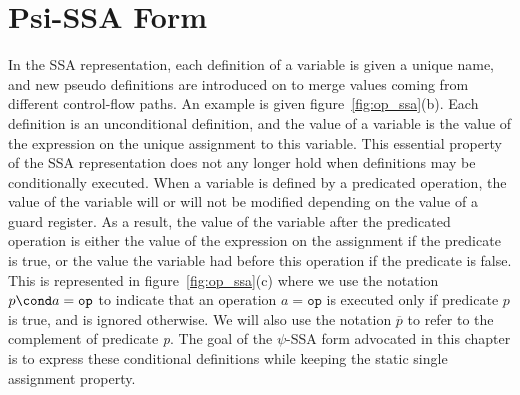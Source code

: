 \chapter{Psi-SSA Form }
\label{chapter:psi_ssa}




In the SSA representation, each definition of a variable is given a
unique name, and new pseudo definitions are introduced on \phifuns to merge values coming from different control-flow paths. An
example is given figure~\ref{fig:op_ssa}(b). Each definition is an
unconditional definition, and the value of a variable is the value of
the expression on the unique assignment to this variable. This
essential property of the SSA representation does not any longer hold
when definitions may be conditionally executed. When a variable is defined by a predicated operation, the value of the variable
will or will not be modified depending on the value of a guard
register. As a result, the value of the variable after the predicated
operation is either the value of the expression on the assignment if
the predicate is true, or the value the variable had before this
operation if the predicate is false. This is represented in
figure~\ref{fig:op_ssa}(c) where we use the notation $p\cond a = \texttt{op}$ to indicate that an operation $a = \texttt{op}$ is executed only if predicate $p$ is true, and is ignored otherwise. We will also use the notation $\overline{{p}}$ to refer to the complement of predicate \textit{p}.
The goal of the $\psi$-SSA form advocated in this chapter is to express these conditional definitions while keeping the static single assignment property.

